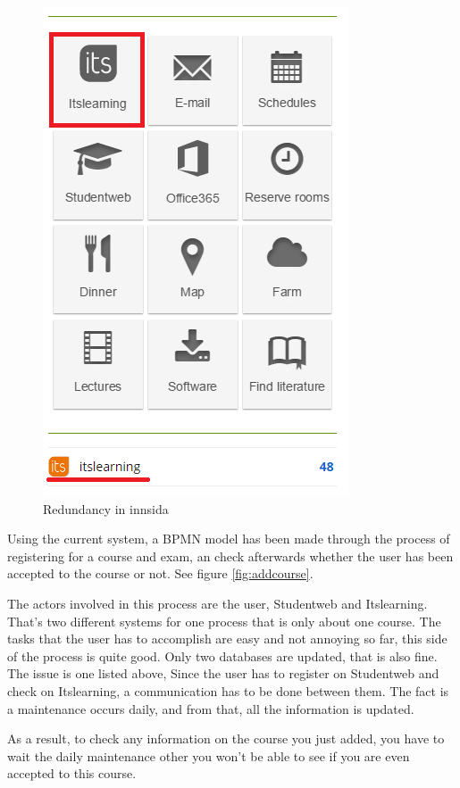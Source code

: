 \begin{figure}[H]
	\begin{center}
		\centerline{\includegraphics[scale=0.6]{redundancy}}
		\caption[Redundancy in innsida]{Redundancy in innsida}
		\label{fig:redundancy}
	\end{center}
\end{figure}

Using the current system, a BPMN model has been made through the process of registering for a course and exam, an check afterwards whether the user has been accepted to the course or not. See figure  {\ref{fig:addcourse}}.
\par
The actors involved in this process are the user, Studentweb and Itslearning. That's two different systems for one process that is only about one course. The tasks that the user has to accomplish are easy and not annoying so far, this side of the process is quite good. Only two databases are updated, that is also fine. The issue is one listed above, Since the user has to register on Studentweb and check on Itslearning, a communication has to be done between them. The fact is a maintenance occurs daily, and from that, all the information is updated.
\par
As a result, to check any information on the course you just added, you have to wait the daily maintenance other you won't be able to see if you are even accepted to this course.

